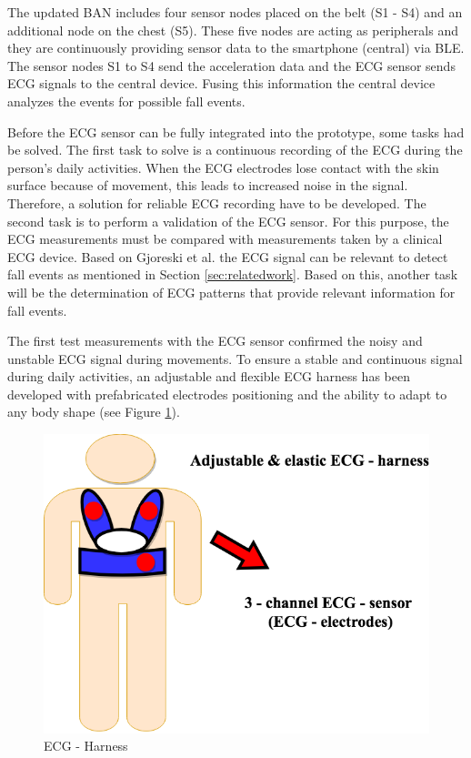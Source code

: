 \documentclass[10pt,journal,compsoc]{IEEEtran}
\begin{document}
The updated BAN includes four sensor nodes placed on the belt (S1 - S4) and an additional node on the chest (S5). These five nodes are acting as peripherals and they are continuously providing sensor data to the smartphone (central) via BLE. The sensor nodes S1 to S4 send the acceleration data and the ECG sensor sends ECG signals to the central device. Fusing this information the central device analyzes the events for possible fall events.

Before the ECG sensor can be fully integrated into the prototype, some tasks had be solved. The first task to solve is a continuous recording of the ECG during the person's daily activities. When the ECG electrodes lose contact with the skin surface because of movement, this leads to increased noise in the signal. Therefore, a solution for reliable ECG recording have to be developed. The second task is to perform a validation of the ECG sensor. For this purpose, the  ECG measurements must be compared with measurements taken by a clinical ECG device. Based on Gjoreski et al. \cite{Gjoreski2014} the ECG signal can be relevant to detect fall events as mentioned in Section \ref{sec:relatedwork}. Based on this, another task will be the determination of ECG patterns that provide relevant information for fall events.

The first test measurements with the ECG sensor confirmed the noisy and unstable ECG signal during movements. To ensure a stable and continuous signal during daily activities, an adjustable and flexible ECG harness has been developed with prefabricated electrodes positioning and the ability to adapt to any body shape (see Figure \ref{fig:ECGHarness}).
\begin{figure}[!ht]
	\centering
	\includegraphics[scale=0.2]{Images/ECG-Harness.png}
	\caption[ECG - Harness]{ECG - Harness}
	\label{fig:ECGHarness}
\end{figure}
\end{document}
